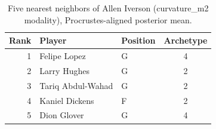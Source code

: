 \begin{table}[htbp]
  \centering\small
  \begin{tabular}{rllc}
    \toprule
    Rank & Player & Position & Archetype \\
    \midrule
    1 & Felipe Lopez & G & 4 \\
    2 & Larry Hughes & G & 2 \\
    3 & Tariq Abdul-Wahad & G & 2 \\
    4 & Kaniel Dickens & F & 2 \\
    5 & Dion Glover & G & 4 \\
    \bottomrule
  \end{tabular}
  \caption{Five nearest neighbors of Allen Iverson (curvature_m2 modality), Procrustes-aligned posterior mean.}
  \label{tab:Allen_Iverson_neighbors_curvature_m2}
\end{table}

